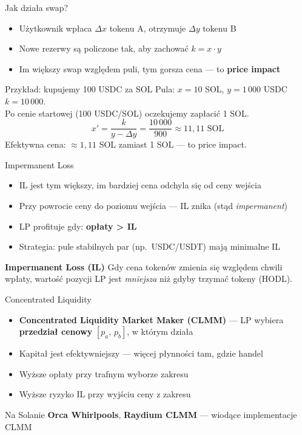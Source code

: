 \begin{frame}{Jak działa swap?}
  \begin{itemize}
    \item Użytkownik wpłaca $\Delta x$ tokenu A, otrzymuje $\Delta y$ tokenu B
    \item Nowe rezerwy są policzone tak, aby zachować $k = x \cdot y$
    \item Im większy swap względem puli, tym gorsza cena --- to \textbf{price impact}
  \end{itemize}
  \vspace{0.3cm}
  \begin{exampleblock}{Przykład: kupujemy 100 USDC za SOL}
    Pula: $x = 10$ SOL, $y = 1\,000$ USDC \quad $k = 10\,000$. \\
    Po cenie startowej (100 USDC/SOL) oczekujemy zapłacić 1 SOL.
    \[
      x' = \frac{k}{y - \Delta y} = \frac{10\,000}{900} \approx 11{,}11 \text{ SOL}
    \]
    Efektywna cena: $\approx 1{,}11$ SOL zamiast 1 SOL --- to price impact.
  \end{exampleblock}
\end{frame}

\begin{frame}{Impermanent Loss}
  \begin{itemize}
    \item IL jest tym większy, im bardziej cena odchyla się od ceny wejścia
    \item Przy powrocie ceny do poziomu wejścia --- IL znika (stąd \emph{impermanent})
    \item LP profituje gdy: \textbf{opłaty > IL}
    \item Strategia: pule stabilnych par (np.\ USDC/USDT) mają minimalne IL
  \end{itemize}
  \vspace{0.3cm}
  \begin{alertblock}{\textbf{Impermanent Loss (IL)}}
    Gdy cena tokenów zmienia się względem chwili wpłaty, wartość pozycji LP jest
    \emph{mniejsza} niż gdyby trzymać tokeny (HODL).
  \end{alertblock}
\end{frame}

\begin{frame}{Concentrated Liquidity}
  \begin{itemize}
    \item \textbf{Concentrated Liquidity Market Maker (CLMM)} --- LP wybiera \textbf{przedział cenowy} $[p_a,\, p_b]$, w którym działa
    \item Kapitał jest efektywniejszy --- więcej płynności tam, gdzie handel
    \item Wyższe opłaty przy trafnym wyborze zakresu
    \item Wyższe ryzyko IL przy wyjściu ceny z zakresu
  \end{itemize}
  \vspace{0.3cm}
  \begin{exampleblock}{Na Solanie}
    \textbf{Orca Whirlpools}, \textbf{Raydium CLMM} --- wiodące implementacje CLMM
  \end{exampleblock}
\end{frame}

